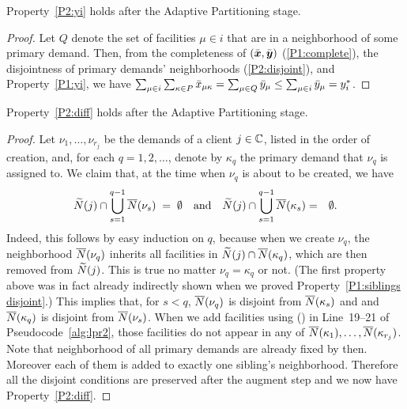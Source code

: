 \documentclass[11pt]{article}
\begin{document}

\begin{lemma}\label{lem: property P2:yi holds}
Property~\ref{P2:yi} holds after the Adaptive Partitioning stage.
\end{lemma}

\begin{proof}
Let $Q$ denote the set of facilities $\mu\in i$ that are in a neighborhood of some primary demand.
Then, from the completeness of $(\bar{\boldsymbol{x}},\bar{\boldsymbol{y}})$ (\ref{P1:complete}),
the disjointness of primary demands' neighborhoods (\ref{P2:disjoint}),
and Property~\ref{P1:yi}, we have
$\sum_{\mu\in i} \sum_{\kappa \in P} {\bar x}_{\mu\kappa} = \sum_{\mu \in Q} {\bar y}_{\mu}
 	\le \sum_{\mu \in i} {\bar y}_{\mu} = y_i^\ast$.
\end{proof}

\begin{lemma}\label{lem: property P2:diff holds}
  Property~\ref{P2:diff} holds after the Adaptive Partitioning stage.
\end{lemma}
\begin{proof}
  Let $\nu_1,\ldots,\nu_{r_j}$ be the demands of a client
  $j\in\mathbb{C}$, listed in the order of creation, and,
  for each $q=1,2,\ldots$, denote by $\kappa_q$ the primary
  demand that $\nu_q$ is assigned to.  We claim that, at the
  time when $\nu_q$ is about to be created, we have
%
\begin{eqnarray*}
{\widetilde N}(j) \cap \bigcup_{s=1}^{q-1} {\overline{N}}(\nu_s) \;=\; \emptyset \quad\textrm{and} \quad
{\widetilde N}(j) \cap \bigcup_{s=1}^{q-1} {\overline{N}}(\kappa_s) &=& \emptyset.
\end{eqnarray*}
%
Indeed, this follows by easy induction on $q$, because when
we create $\nu_q$, the neighborhood ${\overline{N}}(\nu_q)$ inherits
all facilities in ${\widetilde N}(j)\cap {\overline{N}}(\kappa_q)$, which
are then removed from ${\widetilde N}(j)$. This is true no matter
$\nu_q = \kappa_q$ or not.  (The first property above was in
fact already indirectly shown when we proved
Property~\ref{P1:siblings disjoint}.) This implies that, for
$s < q$, ${\overline{N}}(\nu_q)$ is disjoint from ${\overline{N}}(\kappa_s)$
and and ${\overline{N}}(\kappa_q)$ is disjoint from
${\overline{N}}(\nu_s)$. When we add facilities using
\AugmentToUnit() in Line~19--21 of
Pseudocode~\ref{alg:lpr2}, those facilities do not appear in
any of ${\overline{N}}(\kappa_1), \ldots,
{\overline{N}}(\kappa_{r_j})$. Note that neighborhood of all primary
demands are already fixed by then. Moreover each of them is
added to exactly one sibling's neighborhood. Therefore all
the disjoint conditions are preserved after the augment step
and we now have Property~\ref{P2:diff}.
\end{proof}
\end{document}
